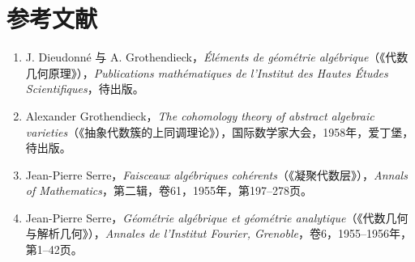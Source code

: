 \section*{参考文献}
\begin{enumerate}
\item[{[1]}] J. Dieudonné 与 A. Grothendieck，\textit{Éléments de géométrie algébrique}（《代数几何原理》），\textit{Publications mathématiques de l'Institut des Hautes Études Scientifiques}，待出版。
\item[{[2]}] Alexander Grothendieck，\textit{The cohomology theory of abstract algebraic varieties}（《抽象代数簇的上同调理论》），国际数学家大会，1958年，爱丁堡，待出版。
\item[{[3]}] Jean-Pierre Serre，\textit{Faisceaux algébriques cohérents}（《凝聚代数层》），\textit{Annals of Mathematics}，第二辑，卷61，1955年，第197--278页。
\item[{[4]}] Jean-Pierre Serre，\textit{Géométrie algébrique et géométrie analytique}（《代数几何与解析几何》），\textit{Annales de l'Institut Fourier, Grenoble}，卷6，1955--1956年，第1--42页。
\end{enumerate}
